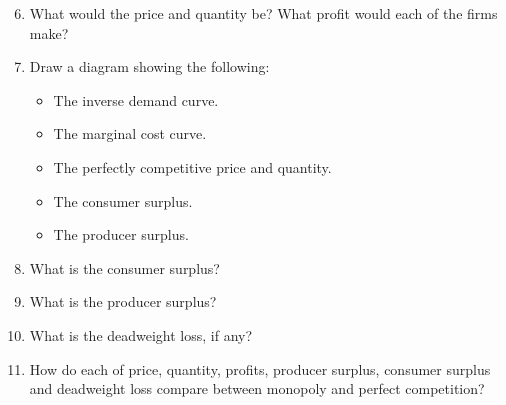 \documentclass[12pt]{article}
\newcounter{question}[section]
\newenvironment{subquestions}{
  \begin{enumerate}[label=(\roman*)]}{\end{enumerate}}
\begin{document}
\begin{subquestions}
  \setcounter{enumi}{5}
  \item What would the price and quantity be? What profit would each of the
    firms make?
  \item Draw a diagram showing the following:
    \begin{itemize}
      \item The inverse demand curve.
      \item The marginal cost curve.
      \item The perfectly competitive price and quantity.
      \item The consumer surplus.
      \item The producer surplus.
    \end{itemize}
  \item What is the consumer surplus?
  \item What is the producer surplus?
  \item What is the deadweight loss, if any?
  \item How do each of price, quantity, profits, producer surplus, consumer
    surplus and deadweight loss compare between monopoly and perfect competition?
\end{subquestions}
\end{document}
